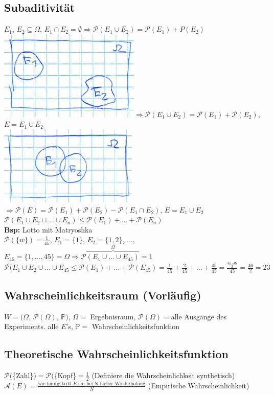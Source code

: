 \documentclass[a4paper,10pt]{article}
\newcommand{\PN}{\mathbb{P}}
\newcommand{\Potp}{\mathcal{P}} %
\newcommand{\Pota}{\mathcal{A}}
\newcommand{\Bold}[1]{\textbf{#1}} %
\newcommand{\T}[1]{\text{#1}} %
\newcommand{\Ra}{\Rightarrow}
\newcommand{\Oneover}[1]{\frac{1}{#1}} %
\begin{document}
\subsection{Subaditivität}
$E_1$, $E_2\subseteq \Omega$, $E_1\cap E_2=\emptyset\Ra \Potp(E_1\cup E_2)=\Potp(E_1)+P(E_2)$\\
\includegraphics[scale=0.5]{Pic2.png}$\Ra\Potp(E_1\cup E_2)=\Potp(E_1)+\Potp(E_2)$, $E=E_1\cup E_2$\\
\includegraphics[scale=0.5]{Pic3.png}$\Ra\Potp(E)=\Potp(E_1)+\Potp(E_2)-\Potp(E_1\cap E_2)$, $E=E_1\cup E_2$\\
$\Potp(E_1\cup E_2 \cup \dots \cup E_n)\leq \Potp(E_1)+\dots+\Potp(E_n)$\\
\Bold{Bsp:} Lotto mit Matryoshka\\
$\Potp(\{w\})=\Oneover{45}$, $E_1 =\{1\}$, $E_2=\{1,2\}$, $\dots$, $E_{45}=\{1,\dots,45\}=\Omega\Ra \Potp\overbrace{(E_1\cup\dots\cup E_{45})}^{\Omega}=1$\\
$\Potp(E_1\cup E_2\cup \dots\cup E_{45}\leq\Potp(E_1)+\dots+\Potp(E_{45})=\Oneover{45}+\frac{2}{45}+\dots+\frac{45}{45}=\frac{\frac{45\cdot46}{2}}{45}=\frac{46}{2}=23$\\
\subsection{Wahrscheinlichkeitsraum (Vorläufig)}
$W=(\Omega$, $\Potp(\Omega)$, $\PN)$, $\Omega=$ Ergebnisraum, $\Potp(\Omega)=$alle Ausgänge des Experiments. alle $E$'s, $\PN=$ Wahrscheinlichkeitsfunktion
\subsection{Theoretische Wahrscheinlichkeitsfunktion}
$\Potp($\{Zahl\}$)=\Potp($\{Kopf\}$=\Oneover{2}$ (Definiere die Wahrscheinlichkeit synthetisch)\\
$\Pota(E)=\frac{\T{wie häufig tritt }E\T{ ein bei N-facher Wiederholung}}{N}$ (Empirische Wahrscheinlichkeit)
\end{document}
